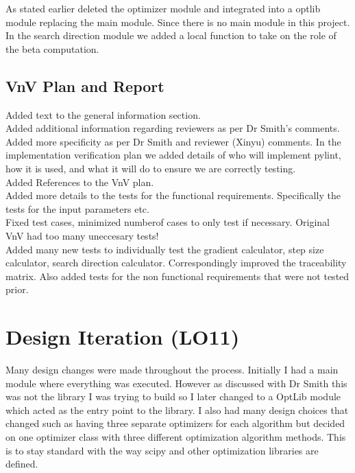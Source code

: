 \documentclass{article}
\begin{document}
As stated earlier deleted the optimizer module and integrated into a optlib module replacing the main module. Since there is no main module in this project.
\\

In the search direction module we added a local function to take on the role of the beta computation.

\subsection{VnV Plan and Report}
Added text to the general information section.
\\

\noindent Added additional information regarding reviewers as per Dr Smith's comments.
\\

\noindent  Added more specificity as per Dr Smith and reviewer (Xinyu) comments. In the implementation verification plan we added details of who will implement pylint, how it is used, and what it will do to ensure we are correctly testing. 
\\


\noindent Added References to the VnV plan.
\\

\noindent Added more details to the tests for the functional requirements. Specifically the tests for the input parameters etc. 
\\

\noindent Fixed test cases, minimized numberof cases to only test if necessary. Original VnV had too many uneccesary tests!
\\

\noindent Added many new tests to individually test the gradient calculator, step size calculator, search direction calculator. Correspondingly improved the traceability matrix. Also added tests for the non functional requirements that were not tested prior.

\section{Design Iteration (LO11)}

Many design changes were made throughout the process. Initially I had a main module where everything was executed. However as discussed with Dr Smith this was not the library I was trying to build so I later changed to a OptLib module which acted as the entry point to the library. I also had many design choices that changed such as having three separate optimizers for each algorithm but decided on one optimizer class with three different optimization algorithm methods. This is to stay standard with the way scipy and other optimization libraries are defined. 
\end{document}
